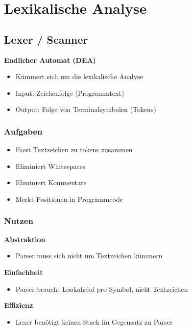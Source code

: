 \section{Lexikalische Analyse}
\subsection{Lexer / Scanner}
\textbf{Endlicher Automat (DEA)}
\begin{itemize}
    \item Kümmert sich um die lexikalische Analyse
    \item Input: Zeichenfolge (Programmtext)
    \item Output: Folge von Terminalsymbolen (Tokens)
\end{itemize}
\subsubsection{Aufgaben}
\begin{itemize}
    \item Fasst Textzeichen zu tokens zusammen
    \item Eliminiert Whitespaces
    \item Eliminiert Kommentare
    \item Merkt Positionen in Programmcode
\end{itemize}
\subsubsection{Nutzen}
\textbf{Abstraktion}
\begin{itemize}
    \item Parser muss sich nicht um Textzeichen kümmern
\end{itemize}
\textbf{Einfachheit}
\begin{itemize}
    \item Parser braucht Lookahead pro Symbol, nicht Textzeichen
\end{itemize}
\textbf{Effizienz}
\begin{itemize}
    \item Lexer benötigt keinen Stack im Gegensatz zu Parser
\end{itemize}

